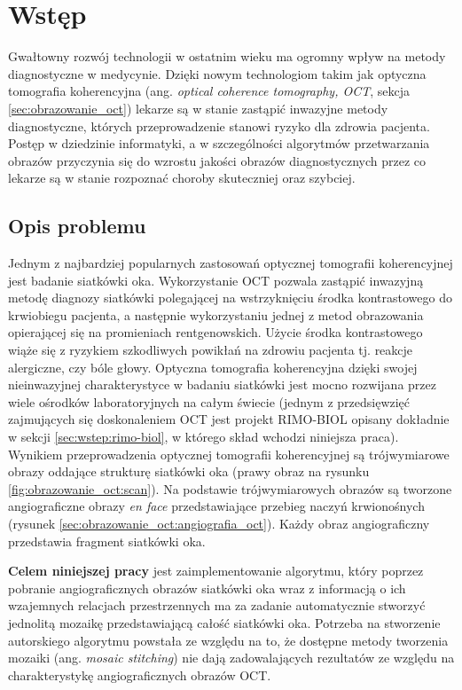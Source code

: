 %
\chapter{Wstęp}
\label{sec:wstep}

Gwałtowny rozwój technologii w ostatnim wieku ma ogromny wpływ na metody diagnostyczne w medycynie. Dzięki nowym technologiom takim jak optyczna tomografia koherencyjna (ang. \textit{optical coherence tomography, OCT}, sekcja \ref{sec:obrazowanie_oct}) lekarze są w stanie zastąpić inwazyjne metody diagnostyczne, których przeprowadzenie stanowi ryzyko dla zdrowia pacjenta. Postęp w dziedzinie informatyki, a w szczególności algorytmów przetwarzania obrazów przyczynia się do wzrostu jakości obrazów diagnostycznych przez co lekarze są w stanie rozpoznać choroby skuteczniej oraz szybciej.

\section{Opis problemu}
\label{sec:wstep:opis_problemu}

Jednym z najbardziej popularnych zastosowań optycznej tomografii koherencyjnej jest badanie siatkówki oka. Wykorzystanie OCT pozwala zastąpić inwazyjną metodę diagnozy siatkówki polegającej na wstrzyknięciu środka kontrastowego do krwiobiegu pacjenta, a następnie wykorzystaniu jednej z metod obrazowania opierającej się na promieniach rentgenowskich. Użycie środka kontrastowego wiąże się z ryzykiem szkodliwych powikłań na zdrowiu pacjenta tj. reakcje alergiczne, czy bóle głowy. Optyczna tomografia koherencyjna dzięki swojej nieinwazyjnej charakterystyce w badaniu siatkówki jest mocno rozwijana przez wiele ośrodków laboratoryjnych na całym świecie (jednym z przedsięwzięć zajmujących się doskonaleniem OCT jest projekt RIMO-BIOL opisany dokładnie w sekcji \ref{sec:wstep:rimo-biol}, w którego skład wchodzi niniejsza praca). Wynikiem przeprowadzenia optycznej tomografii koherencyjnej są trójwymiarowe obrazy oddające strukturę siatkówki oka (prawy obraz na rysunku \ref{fig:obrazowanie_oct:scan}). Na podstawie trójwymiarowych obrazów są tworzone angiograficzne obrazy \textit{en face} przedstawiające przebieg naczyń krwionośnych (rysunek \ref{sec:obrazowanie_oct:angiografia_oct}). Każdy obraz angiograficzny przedstawia fragment siatkówki oka.

\textbf{Celem niniejszej pracy} jest zaimplementowanie algorytmu, który poprzez pobranie angiograficznych obrazów siatkówki oka wraz z informacją o ich wzajemnych relacjach przestrzennych ma za zadanie automatycznie stworzyć jednolitą mozaikę przedstawiającą całość siatkówki oka. Potrzeba na stworzenie autorskiego algorytmu powstała ze względu na to, że dostępne metody tworzenia mozaiki (ang. \textit{mosaic stitching}) nie dają zadowalających rezultatów ze względu na charakterystykę angiograficznych obrazów OCT.

